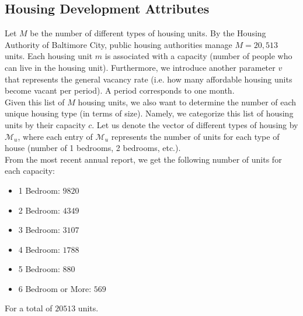 \documentclass[11pt]{article}
\begin{document}
\subsection{Housing Development Attributes}
Let $M$ be the number of different types of housing units. By the Housing Authority of Baltimore City, public housing authorities manage  $M = 20,513$ units. Each housing unit $m$ is associated with a capacity (number of people who can live in the housing unit). Furthermore, we introduce another parameter $v$ that represents the general vacancy rate (i.e. how many affordable housing units become vacant per period). A period corresponds to one month.\\
\newline
Given this list of $M$ housing units, we also want to determine the number of each unique housing type (in terms of size). Namely, we categorize this list of housing units by their capacity $c$. Let us denote the vector of different types of housing by $\mathcal{M}_u$, where each entry of $\mathcal{M}_u$ represents the number of units for each type of house (number of 1 bedrooms, 2 bedrooms, etc.). \\
\newline
From the most recent annual report, we get the following number of units for each capacity:
\begin{itemize}
    \item 1 Bedroom: $9820$
    \item 2 Bedroom: $4349$
    \item 3 Bedroom: $3107$
    \item 4 Bedroom: $1788$
    \item 5 Bedroom: $880$
    \item 6 Bedroom or More: $569$ 
\end{itemize}
For a total of $20513$ units.
\end{document}
